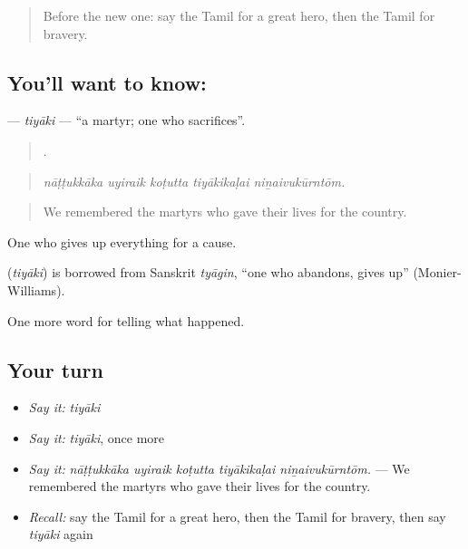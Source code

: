 \label{lesson:TA-C339-tiyaki}



\begin{quote}
Before the new one: say the Tamil for a great hero, then the Tamil for bravery.
\end{quote}

\subsection*{You'll want to know: }
\textbf{} — \emph{tiyāki} — \textquotedblleft{}a martyr; one who sacrifices\textquotedblright{}.

\begin{quote}
    .
\end{quote}

\begin{quote}
\emph{nāṭṭukkāka uyiraik koṭutta tiyākikaḷai niṉaivukūrntōm.}
\end{quote}

\begin{quote}
We remembered the martyrs who gave their lives for the country.
\end{quote}

One who gives up everything for a cause.

\begin{cousinweb}
\textbf{} (\emph{tiyāki}) is borrowed from Sanskrit \emph{tyāgin}, \textquotedblleft{}one who abandons, gives up\textquotedblright{} (Monier-Williams).
\end{cousinweb}

\begin{grammarlens}[title={What you've built}]
One more word for telling what happened.
\end{grammarlens}

\subsection*{Your turn}
\begin{itemize}
\raggedright
  \item \emph{Say it:} \emph{tiyāki}
  \item \emph{Say it:} \emph{tiyāki}, once more
  \item \emph{Say it:} \emph{nāṭṭukkāka uyiraik koṭutta tiyākikaḷai niṉaivukūrntōm.} — We remembered the martyrs who gave their lives for the country.
  \item \emph{Recall:} say the Tamil for a great hero, then the Tamil for bravery, then say \emph{tiyāki} again
\end{itemize}

